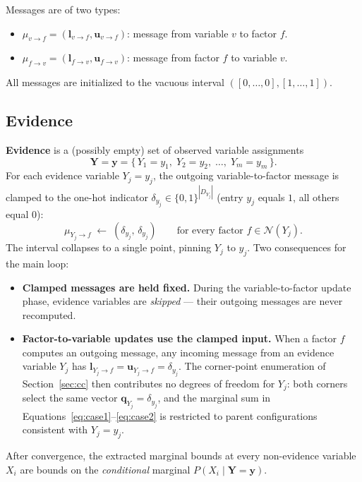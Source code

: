 \documentclass[11pt]{article}
\begin{document}
Messages are of two types:
\begin{itemize}
  \item $\mu_{v \to f} = (\mathbf{l}_{v \to f}, \mathbf{u}_{v \to f})$:
        message from variable $v$ to factor $f$.
  \item $\mu_{f \to v} = (\mathbf{l}_{f \to v}, \mathbf{u}_{f \to v})$:
        message from factor $f$ to variable $v$.
\end{itemize}

All messages are initialized to the vacuous interval $([0, \dots, 0], [1, \dots, 1])$.

\subsection{Evidence}\label{sec:evidence}

\textbf{Evidence} is a (possibly empty) set of observed variable assignments
\[
  \mathbf{Y} = \mathbf{y} = \{\, Y_1 = y_1,\; Y_2 = y_2,\; \ldots,\; Y_m = y_m \,\}.
\]
For each evidence variable $Y_j = y_j$, the outgoing variable-to-factor message
is clamped to the one-hot indicator $\delta_{y_j} \in \{0,1\}^{|D_{Y_j}|}$
(entry $y_j$ equals $1$, all others equal $0$):
\[
  \mu_{Y_j \to f} \;\gets\; (\delta_{y_j},\, \delta_{y_j}) \qquad
  \text{for every factor } f \in \mathcal{N}(Y_j).
\]
The interval collapses to a single point, pinning $Y_j$ to $y_j$. Two
consequences for the main loop:
\begin{itemize}
  \item \textbf{Clamped messages are held fixed.} During the variable-to-factor
        update phase, evidence variables are \emph{skipped} --- their outgoing
        messages are never recomputed.
  \item \textbf{Factor-to-variable updates use the clamped input.} When a factor
        $f$ computes an outgoing message, any incoming message from an evidence
        variable $Y_j$ has $\mathbf{l}_{Y_j \to f} = \mathbf{u}_{Y_j \to f}
        = \delta_{y_j}$. The corner-point enumeration of Section~\ref{sec:cc}
        then contributes no degrees of freedom for $Y_j$: both corners select
        the same vector $\mathbf{q}_{Y_j} = \delta_{y_j}$, and the marginal
        sum in Equations~\ref{eq:case1}--\ref{eq:case2} is restricted to parent
        configurations consistent with $Y_j = y_j$.
\end{itemize}
After convergence, the extracted marginal bounds at every non-evidence variable
$X_i$ are bounds on the \emph{conditional} marginal $P(X_i \mid \mathbf{Y} = \mathbf{y})$.
\end{document}
